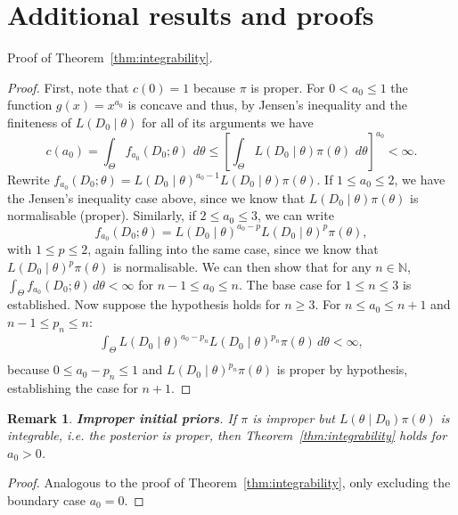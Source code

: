 \documentclass[a4paper, notitlepage, 11pt]{article}
\newtheorem{remark}{Remark}[]
\begin{document}
\appendix


\section{Additional results and proofs}
\label{sec:further_proofs}

Proof of Theorem~\ref{thm:integrability}.
\begin{proof}
 First, note that $c(0) = 1$ because $\pi$ is proper.
For $0 < a_0 \leq 1$ the function $g(x) = x^{a_0}$ is concave and thus, by Jensen's inequality and the finiteness of $L( D_0 \mid \theta)$ for all of its arguments we have
\[ c(a_0) = \int_{\Theta} f_{a_0}(D_0; \theta) \, \, d\theta \leq \left[ \int_{\Theta} L(D_0  \mid \theta)\pi(\theta) \, \, d\theta \right]^{a_0} < \infty. \]
Rewrite $f_{a_0}(D_0; \theta) = L(D_0 \mid \theta)^{a_0 -1} L(D_0 \mid \theta)\pi(\theta)$.
If $1 \leq a_0 \leq 2$, we have the Jensen's inequality case above, since we know that $L(D_0 \mid \theta)\pi(\theta)$ is normalisable (proper).
Similarly, if $2 \leq a_0 \leq 3$, we can write 
\[  f_{a_0}(D_0; \theta) = L(D_0 \mid \theta)^{a_0-p} L(D_0 \mid \theta)^p\pi(\theta), \]
with $1 \leq p \leq 2$, again falling into the same case, since we know that $L(D_0 \mid \theta)^{p}\pi(\theta)$ is normalisable.
We can then show that for any $n \in \mathbb{N}$, $\int_{\Theta}f_{a_0}( D_0 ; \theta)\, d\theta < \infty$ for  $n-1 \leq a_0 \leq n$.
The base case for $1 \leq n \leq 3$ is established.
Now suppose the hypothesis holds for $n \geq 3$.
For $ n \leq  a_0 \leq n + 1$ and $n-1 \leq p_n \leq n$:
\begin{align*}
 \int_{\Theta} L(D_0 \mid \theta)^{a_0-p_n} L(D_0 \mid \theta)^{p_n}\pi(\theta)\, d\theta < \infty, \\
\end{align*}
because $0 \leq a_0 - p_n \leq 1$ and $L(D_0 \mid \theta)^{p_n}\pi(\theta)$ is proper by hypothesis, establishing the case for $n + 1$.
\end{proof}

\begin{remark}
 \label{rmk:improper}
 \textbf{Improper initial priors}. If $\pi$ is improper but $L(\theta \mid D_0)\pi(\theta)$ is integrable, i.e. the posterior is proper, then Theorem~\ref{thm:integrability} holds for $a_0 > 0$.
\end{remark}
\begin{proof}
 Analogous to the proof of Theorem~\ref{thm:integrability}, only excluding the boundary case $a_0 = 0$.
\end{proof}
\end{document}
